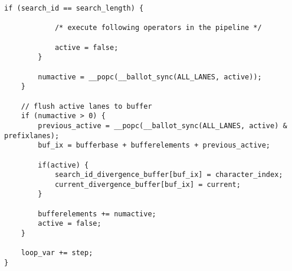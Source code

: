 \begin{lstlisting}[language=MyC++,
caption=Umsetzung der String-Selektion mit Lane Refill]
		if (search_id == search_length) {
		
			/* execute following operators in the pipeline */
		
			active = false;
		}
		
		numactive = __popc(__ballot_sync(ALL_LANES, active));
	}
	
	// flush active lanes to buffer
	if (numactive > 0) {
		previous_active = __popc(__ballot_sync(ALL_LANES, active) & prefixlanes);
		buf_ix = bufferbase + bufferelements + previous_active;
		
		if(active) {
			search_id_divergence_buffer[buf_ix] = character_index;
			current_divergence_buffer[buf_ix] = current;
		}
		
		bufferelements += numactive;
		active = false;
	}
	
	loop_var += step;
}
\end{lstlisting}

